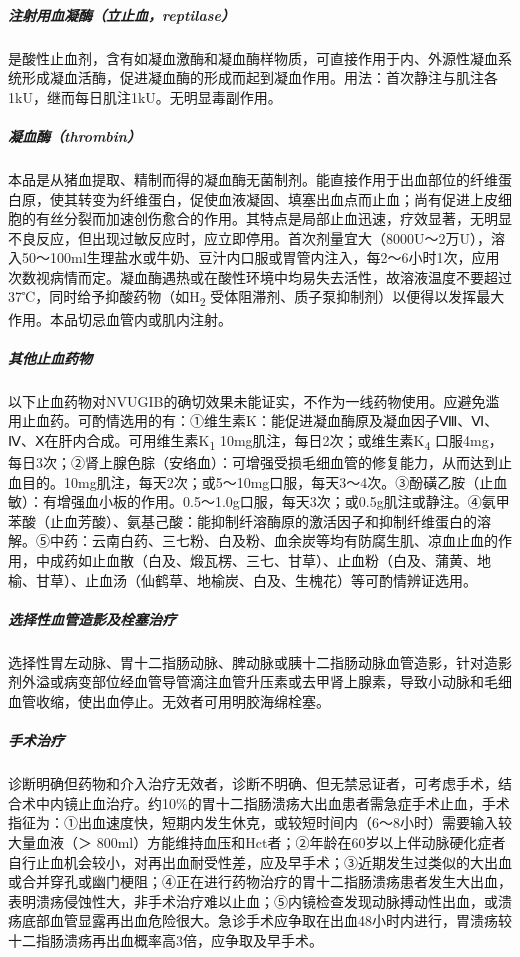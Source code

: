 \subparagraph{注射用血凝酶（立止血，reptilase）}

是酸性止血剂，含有如凝血激酶和凝血酶样物质，可直接作用于内、外源性凝血系统形成凝血活酶，促进凝血酶的形成而起到凝血作用。用法：首次静注与肌注各1kU，继而每日肌注1kU。无明显毒副作用。

\subparagraph{凝血酶（thrombin）}

本品是从猪血提取、精制而得的凝血酶无菌制剂。能直接作用于出血部位的纤维蛋白原，使其转变为纤维蛋白，促使血液凝固、填塞出血点而止血；尚有促进上皮细胞的有丝分裂而加速创伤愈合的作用。其特点是局部止血迅速，疗效显著，无明显不良反应，但出现过敏反应时，应立即停用。首次剂量宜大（8000U～2万U），溶入50～100ml生理盐水或牛奶、豆汁内口服或胃管内注入，每2～6小时1次，应用次数视病情而定。凝血酶遇热或在酸性环境中均易失去活性，故溶液温度不要超过37℃，同时给予抑酸药物（如H\textsubscript{2}
受体阻滞剂、质子泵抑制剂）以便得以发挥最大作用。本品切忌血管内或肌内注射。

\subparagraph{其他止血药物}

以下止血药物对NVUGIB的确切效果未能证实，不作为一线药物使用。应避免滥用止血药。可酌情选用的有：①维生素K：能促进凝血酶原及凝血因子Ⅷ、Ⅵ、Ⅳ、Ⅹ在肝内合成。可用维生素K\textsubscript{1}
10mg肌注，每日2次；或维生素K\textsubscript{4}
口服4mg，每日3次；②肾上腺色腙（安络血）：可增强受损毛细血管的修复能力，从而达到止血目的。10mg肌注，每天2次；或5～10mg口服，每天3～4次。③酚磺乙胺（止血敏）：有增强血小板的作用。0.5～1.0g口服，每天3次；或0.5g肌注或静注。④氨甲苯酸（止血芳酸）、氨基己酸：能抑制纤溶酶原的激活因子和抑制纤维蛋白的溶解。⑤中药：云南白药、三七粉、白及粉、血余炭等均有防腐生肌、凉血止血的作用，中成药如止血散（白及、煅瓦楞、三七、甘草）、止血粉（白及、蒲黄、地榆、甘草）、止血汤（仙鹤草、地榆炭、白及、生槐花）等可酌情辨证选用。

\subparagraph{选择性血管造影及栓塞治疗}

选择性胃左动脉、胃十二指肠动脉、脾动脉或胰十二指肠动脉血管造影，针对造影剂外溢或病变部位经血管导管滴注血管升压素或去甲肾上腺素，导致小动脉和毛细血管收缩，使出血停止。无效者可用明胶海绵栓塞。

\subparagraph{手术治疗}

诊断明确但药物和介入治疗无效者，诊断不明确、但无禁忌证者，可考虑手术，结合术中内镜止血治疗。约10\%的胃十二指肠溃疡大出血患者需急症手术止血，手术指征为：①出血速度快，短期内发生休克，或较短时间内（6～8小时）需要输入较大量血液（＞
800ml）方能维持血压和Hct者；②年龄在60岁以上伴动脉硬化症者自行止血机会较小，对再出血耐受性差，应及早手术；③近期发生过类似的大出血或合并穿孔或幽门梗阻；④正在进行药物治疗的胃十二指肠溃疡患者发生大出血，表明溃疡侵蚀性大，非手术治疗难以止血；⑤内镜检查发现动脉搏动性出血，或溃疡底部血管显露再出血危险很大。急诊手术应争取在出血48小时内进行，胃溃疡较十二指肠溃疡再出血概率高3倍，应争取及早手术。

